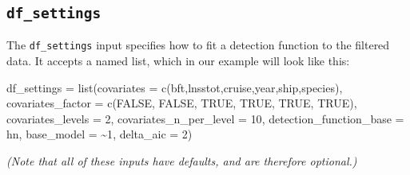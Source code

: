 \documentclass[
]{book}
\newenvironment{Shaded}{\begin{snugshade}}{\end{snugshade}}
\newcommand{\AttributeTok}[1]{\textcolor[rgb]{0.77,0.63,0.00}{#1}}
\newcommand{\ConstantTok}[1]{\textcolor[rgb]{0.00,0.00,0.00}{#1}}
\newcommand{\DecValTok}[1]{\textcolor[rgb]{0.00,0.00,0.81}{#1}}
\newcommand{\FunctionTok}[1]{\textcolor[rgb]{0.00,0.00,0.00}{#1}}
\newcommand{\NormalTok}[1]{#1}
\newcommand{\OtherTok}[1]{\textcolor[rgb]{0.56,0.35,0.01}{#1}}
\newcommand{\StringTok}[1]{\textcolor[rgb]{0.31,0.60,0.02}{#1}}
\begin{document}
~

\hypertarget{df_settings}{%
\subsection*{\texorpdfstring{\texttt{df\_settings}}{df\_settings}}\label{df_settings}}

The \texttt{df\_settings} input specifies how to fit a detection function to the filtered data. It accepts a named list, which in our example will look like this:

\begin{Shaded}
\begin{Highlighting}[]
\NormalTok{df\_settings }\OtherTok{=} \FunctionTok{list}\NormalTok{(}\AttributeTok{covariates =} \FunctionTok{c}\NormalTok{(}\StringTok{\textquotesingle{}bft\textquotesingle{}}\NormalTok{,}\StringTok{\textquotesingle{}lnsstot\textquotesingle{}}\NormalTok{,}\StringTok{\textquotesingle{}cruise\textquotesingle{}}\NormalTok{,}\StringTok{\textquotesingle{}year\textquotesingle{}}\NormalTok{,}\StringTok{\textquotesingle{}ship\textquotesingle{}}\NormalTok{,}\StringTok{\textquotesingle{}species\textquotesingle{}}\NormalTok{),}
                   \AttributeTok{covariates\_factor =} \FunctionTok{c}\NormalTok{(}\ConstantTok{FALSE}\NormalTok{, }\ConstantTok{FALSE}\NormalTok{, }\ConstantTok{TRUE}\NormalTok{, }\ConstantTok{TRUE}\NormalTok{, }\ConstantTok{TRUE}\NormalTok{, }\ConstantTok{TRUE}\NormalTok{),}
                   \AttributeTok{covariates\_levels =} \DecValTok{2}\NormalTok{,}
                   \AttributeTok{covariates\_n\_per\_level =} \DecValTok{10}\NormalTok{,}
                   \AttributeTok{detection\_function\_base =} \StringTok{\textquotesingle{}hn\textquotesingle{}}\NormalTok{,}
                   \AttributeTok{base\_model =} \StringTok{\textquotesingle{}\textasciitilde{}1\textquotesingle{}}\NormalTok{,}
                   \AttributeTok{delta\_aic =} \DecValTok{2}\NormalTok{)}
\end{Highlighting}
\end{Shaded}

\emph{(Note that all of these inputs have defaults, and are therefore optional.)}
\end{document}
